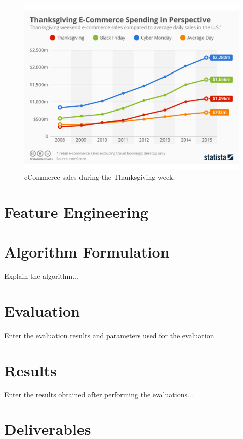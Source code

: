 \documentclass{article}
\begin{document}
\begin{figure}[ht]
	\centerline{\includegraphics[width=\columnwidth]{Thanksgiving_sales}}
	\caption{eCommerce sales during the Thanksgiving week.}
	\label{thanksgiving}
	\vskip 0.15in
\end{figure} 


\section{Feature Engineering} 
	\label{engineer} 

	

\section{Algorithm Formulation} 
	\label{algorithm} 

	Explain the algorithm...

\section{Evaluation} 
	\label{eval} 

	Enter the evaluation results and parameters used for the evaluation

\section{Results} 
	\label{result} 

	Enter the results obtained after performing the evaluations... 

\section{Deliverables}
	\label{time}
	
\end{document}
